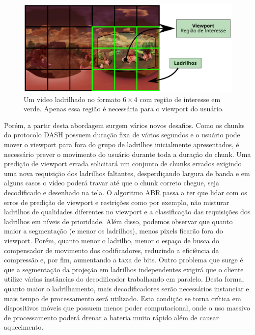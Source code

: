 \begin{figure}[htb]
	\centering
	\includegraphics[width=0.80\columnwidth]{fig/viewport2.pdf}
	\caption{Um vídeo ladrilhado no formato $6 \times 4$ com região de interesse em verde. Apenas essa região é necessária para o viewport do usuário.}
	\label{fig:viewport2}
\end{figure}

Porém, a partir desta abordagem surgem vários novos desafios. Como os chunks do protocolo DASH possuem duração fixa de vários segundos e o usuário pode mover o viewport para fora do grupo de ladrilhos inicialmente apresentados, é necessário prever o movimento do usuário durante toda a duração do chunk. Uma predição de viewport errada solicitará um conjunto de chunks errados exigindo uma nova requisição dos ladrilhos faltantes, desperdiçando largura de banda e em alguns casos o vídeo poderá travar até que o chunk correto chegue, seja decodificado e desenhado na tela. O algoritmo ABR passa a ter que lidar com os erros de predição de viewport e restrições como por exemplo, não misturar ladrilhos de qualidades diferentes no viewport e a classificação das requisições dos ladrilhos em níveis de prioridade. Além disso, podemos observar que quanto maior a segmentação (e menor os ladrilhos), menos pixels ficarão fora do viewport. Porém, quanto menor o ladrilho, menor o espaço de busca do compensador de movimento dos codificadores, reduzindo a eficiência da compressão e, por fim, aumentando a taxa de bits. Outro problema que surge é que a segmentação da projeção em ladrilhos independentes exigirá que o cliente utilize várias instâncias do decodificador trabalhando em paralelo. Desta forma, quanto maior o ladrilhamento, mais decodificadores serão necessários instanciar e mais tempo de processamento será utilizado. Esta condição se torna crítica em dispositivos móveis que possuem menos poder computacional, onde o uso massivo de processamento poderá drenar a bateria muito rápido além de causar aquecimento.

